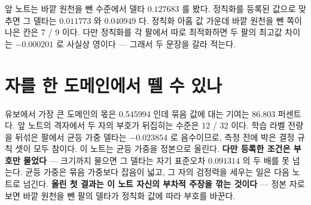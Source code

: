 앞 노트는 바깥 원천을 뺀 수준에서 델타 $0.127683$ 를 봤다. 정칙화를 등록된 값으로 맞추면 그 델타는 $0.011773$ 와 $0.040949$ 다. 정칙화 아홉 값 가운데 바깥 원천을 뺀 쪽이 나은 칸은 7 / 9 이다. 다만 정칙화를 각 팔에서 따로 최적화하면 두 팔의 최고값 차이는 $-0.000201$ 로 사실상 영이다 --- 그래서 두 문장을 갈라 적는다.

\section{자를 한 도메인에서 뗄 수 있나}


유보에서 가장 큰 도메인의 몫은 0.545994 인데 묶음 값에 대는 기여는 86.803 퍼센트다. 앞 노트의 격자에서 두 자의 부호가 뒤집히는 수준은 12 / 32 이다. 학습 라벨 전량을 뒤섞은 팔에서 균등 가중 델타는 $-0.023854$ 로 음수이므로, 측정 전에 박은 결정 규칙 셋이 모두 참이다. 이 노트는 균등 가중을 정본으로 올린다. \textbf{다만 등록한 조건은 부호만 물었다} --- 크기까지 물으면 그 델타는 자기 표준오차 $0.091314$ 의 두 배를 못 넘는다. 균등 가중은 묶음 가중보다 잡음이 넓고, 그 자의 검정력을 세우는 일은 다음 노트로 넘긴다. \textbf{올린 첫 결과는 이 노트 자신의 부차적 주장을 깎는 것이다} --- 정본 자로 보면 바깥 원천을 뺀 팔의 델타가 정칙화 값에 따라 부호를 바꾼다.
